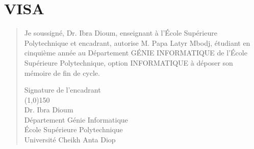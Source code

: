 %
%
%
%
%
%
\chapter*{VISA}
\begin{SingleSpace}
	\begin{quotation}
		\large {
			Je soussigné, Dr. Ibra Dioum, enseignant à l’École Supérieure
			Polytechnique et encadrant, autorise M. Papa Latyr Mbodj, étudiant en cinquième année au Département GÉNIE INFORMATIQUE de l’École Supérieure
			Polytechnique, option INFORMATIQUE à déposer son mémoire de fin de cycle.} 
		\vspace{6cm}
		\begin{center}
			\large{Signature de l'encadrant}\\
			\vspace{12mm}
			\line(1,0){150}\\
			\large {Dr. Ibra Dioum}\\
			\vspace{2mm}
			\large {Département Génie Informatique}\\
			\large {École Supérieure Polytechnique}\\
			\large {Université Cheikh Anta Diop}\\
		\end{center}
		
		
	\end{quotation}
\end{SingleSpace}
